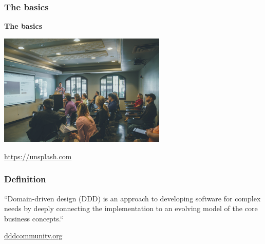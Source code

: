 \documentclass{beamer}
\newcommand{\source}[2]{
	\begin{flushright}
		\hfill {\scriptsize \href{#1}{#2}}	
	\end{flushright}
}
\begin{document}
\begin{frame}
\frametitle{\textbf{The basics}}

\begin{minipage}{0.45\textwidth}
\begin{center}
    {\fontsize{50}{60}\selectfont \textbf{The basics}}
\end{center}
\end{minipage}
\begin{minipage}{0.45\textwidth}
    \hspace{15mm}
    \includegraphics[width=80mm]{basics.jpg}
    \source{https://unsplash.com/photos/1-aA2Fadydc}{https://unsplash.com}
\end{minipage}

\end{frame}

\begin{frame}
\frametitle{\textbf{Definition}}

\begin{displayquote}
    ``Domain-driven design (DDD) is an approach to developing software for complex needs by deeply connecting the implementation to an evolving model of the core business concepts.``
\end{displayquote}
\vskip 2mm
\source{https://dddcommunity.org/learning-ddd/what_is_ddd/}{dddcommunity.org}



\end{frame}
\end{document}
